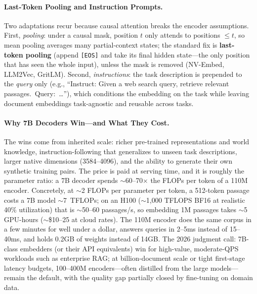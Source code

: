 \paragraph{Last-Token Pooling and Instruction Prompts.}
Two adaptations recur because causal attention breaks the encoder
assumptions.  First, \emph{pooling}: under a causal mask, position $t$ only
attends to positions $\leq t$, so mean pooling averages many
partial-context states; the standard fix is \textbf{last-token pooling}
(append \texttt{[EOS]} and take its final hidden state---the only position
that has seen the whole input), unless the mask is removed
(NV-Embed, LLM2Vec, GritLM).  Second, \emph{instructions}: the task
description is prepended to the \emph{query} only (e.g., ``Instruct: Given a
web search query, retrieve relevant passages.\ Query:~\ldots''), which
conditions the embedding on the task while leaving document embeddings
task-agnostic and reusable across tasks.

\paragraph{Why 7B Decoders Win---and What They Cost.}
The wins come from inherited scale: richer pre-trained representations and
world knowledge, instruction-following that generalizes to unseen task
descriptions, larger native dimensions (3584--4096), and the ability to
generate their own synthetic training pairs.  The price is paid at serving
time, and it is roughly the parameter ratio: a 7B decoder spends
$\sim$60--70$\times$ the FLOPs per token of a 110M encoder.  Concretely, at
$\sim$2 FLOPs per parameter per token, a 512-token passage costs a 7B model
$\sim$7~TFLOPs; on an H100 ($\sim$1{,}000 TFLOPS BF16 at realistic 40\%
utilization) that is $\sim$50--60 passages/s, so embedding 1M passages takes
$\sim$5 GPU-hours ($\sim$\$10--25 at cloud rates).  The 110M encoder does
the same corpus in a few minutes for well under a dollar, answers queries in
2--5ms instead of 15--40ms, and holds 0.2GB of weights instead of 14GB.
The 2026 judgment call: 7B-class embedders (or their API equivalents) win
for high-value, moderate-QPS workloads such as enterprise RAG; at
billion-document scale or tight first-stage latency budgets, 100--400M
encoders---often distilled from the large models---remain the default, with
the quality gap partially closed by fine-tuning on domain data.


